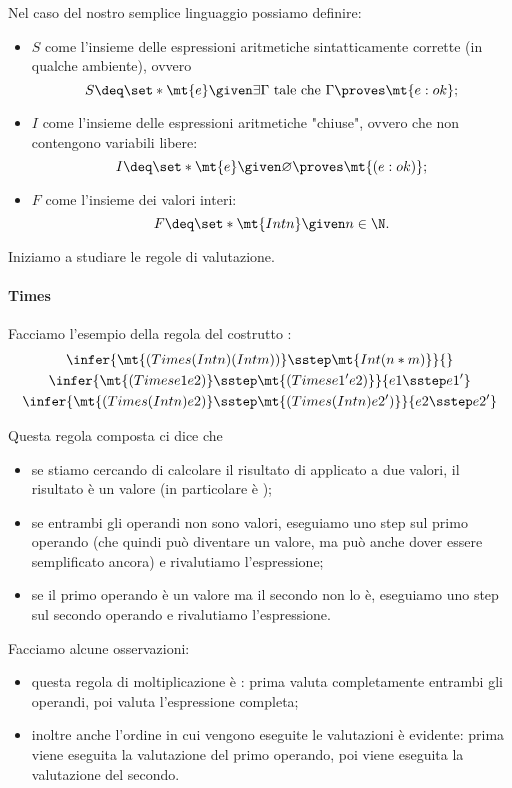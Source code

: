 Nel caso del nostro semplice linguaggio possiamo definire:
\begin{itemize}
    \item $S$ come l'insieme delle espressioni aritmetiche sintatticamente corrette (in qualche ambiente), ovvero \[
        S \deq \set*{\mt{e} \given \exists\Gamma \text{ tale che } \Gamma \proves \mt{e : ok}};    
    \]
    \item $I$ come l'insieme delle espressioni aritmetiche "chiuse", ovvero che non contengono variabili libere: \[
        I \deq \set*{\mt{e} \given \varnothing \proves \mt{(e : ok)}};    
    \]
    \item $F$ come l'insieme dei valori interi: \[
        F \deq \set*{\mt{Int n} \given n \in \N}.
    \]
\end{itemize}

Iniziamo a studiare le regole di valutazione.
\paragraph{Times} Facciamo l'esempio della regola del costrutto :
\begin{gather*}
    \infer{
        \mt{(Times (Int n) (Int m))} \sstep \mt{Int (n * m)}
    }{}\\
    \infer{
        \mt{(Times e1 e2)} \sstep \mt{(Times e1' e2)}
    }{
        e1 \sstep e1'
    }\\
    \infer{
        \mt{(Times (Int n) e2)} \sstep \mt{(Times (Int n) e2')}
    }{
        e2 \sstep e2'
    }
\end{gather*}

Questa regola composta ci dice che \begin{itemize}
    \item se stiamo cercando di calcolare il risultato di  applicato a due valori, il risultato è un valore (in particolare è );
    \item se entrambi gli operandi non sono valori, eseguiamo uno step sul primo operando (che quindi può diventare un valore, ma può anche dover essere semplificato ancora) e rivalutiamo l'espressione;
    \item se il primo operando è un valore ma il secondo non lo è, eseguiamo uno step sul secondo operando e rivalutiamo l'espressione.
\end{itemize}
Facciamo alcune osservazioni:
\begin{itemize}
    \item questa regola di moltiplicazione è : prima valuta completamente entrambi gli operandi, poi valuta l'espressione completa;
    \item inoltre anche l'ordine in cui vengono eseguite le valutazioni è evidente: prima viene eseguita la valutazione del primo operando, poi viene eseguita la valutazione del secondo.
\end{itemize}


